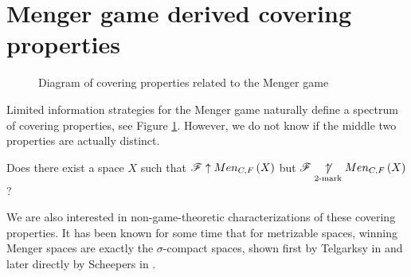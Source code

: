 \section{Menger game derived covering properties}

\begin{figure}[h]
\begin{center}
\end{center}
\caption{Diagram of covering properties related to the Menger game}
\label{menSpec}
\end{figure}

Limited information strategies for the Menger game naturally define a spectrum
of covering properties, see Figure \ref{menSpec}. However,
we do not know if the middle two properties are actually distinct.

\begin{ques}\label{perfectTo2Mark}
  Does there exist a space $X$ such that $\mathscr{F} \uparrow Men_{C,F}\left({X}\right)$ but
  $\mathscr{F} \underset{2\text{-mark}}{\not\uparrow} Men_{C,F}\left({X}\right)$?
\end{ques}

We are also interested in non-game-theoretic characterizations of these
covering properties. It has been known for some time that for metrizable spaces,
winning Menger spaces are exactly the $\sigma$-compact spaces, shown first
by Telgarksy in \cite{MR753073} and later directly by Scheepers in
\cite{MR1273523}.

